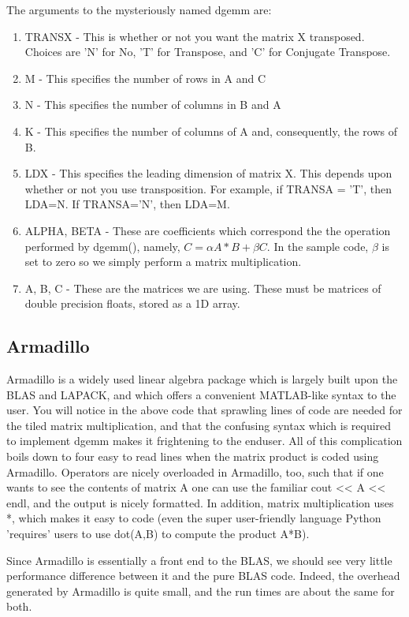 The arguments to the mysteriously named dgemm are:
\begin{enumerate}
\item TRANSX - This is whether or not you want the matrix X transposed. Choices are 'N' for No, 'T' for Transpose, and 'C' for Conjugate Transpose.
\item M - This specifies the number of rows in A and C
\item  N - This specifies the number of columns in B and A
\item K - This specifies the number of columns of A and, consequently, the rows of B.
\item LDX - This specifies the leading dimension of matrix X. This depends upon whether or not you use transposition. For example, if TRANSA = 'T', then LDA=N. If TRANSA='N', then LDA=M.
\item ALPHA, BETA - These are coefficients which correspond the the operation performed by dgemm(), namely, $C = \alpha A*B + \beta C$. In the sample code, $\beta$ is set to zero so we simply perform a matrix multiplication.
\item A, B, C - These are the matrices we are using. These must be matrices of double precision floats, stored as a 1D array.
\end{enumerate}
\subsection{Armadillo}
Armadillo is a widely used linear algebra package which is largely built upon the BLAS and LAPACK, and which offers a convenient MATLAB-like syntax to the user. You will notice in the above code that sprawling lines of code are needed for the tiled matrix multiplication, and that the confusing syntax which is required to implement dgemm makes it frightening to the enduser. All of this complication boils down to four easy to read lines when the matrix product is coded using Armadillo. Operators are nicely overloaded in Armadillo, too, such that if one wants to see the contents of matrix A one can use the familiar cout << A << endl, and the output is nicely formatted. In addition, matrix multiplication uses *, which makes it easy to code (even the super user-friendly language Python 'requires' users to use dot(A,B) to compute  the product A*B).

Since Armadillo is essentially a front end to the BLAS, we should see very little performance difference between it and the pure BLAS code. Indeed, the overhead generated by Armadillo is quite small, and the run times are about the same for both.

